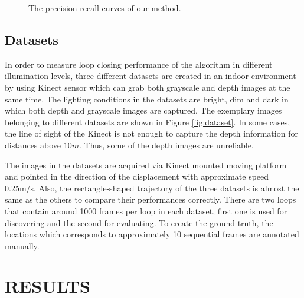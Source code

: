 \documentclass[]{spie}  %
\begin{document}
\begin{figure}
        \hspace{-3mm}
        \caption{The precision-recall curves of our method.}
        \label{fig:pr_curves}
\end{figure}

\subsection{Datasets}

In order to measure loop closing performance of the algorithm in different illumination levels, three different datasets are created in an indoor environment by using Kinect sensor which can grab both grayscale and depth images at the same time. The lighting conditions in the datasets are bright, dim and dark in which both depth and grayscale images are captured. The exemplary images belonging to different datasets are shown in Figure \ref{fig:dataset}. In some cases, the line of sight of the Kinect is not enough to capture the depth information for distances above $10m$. Thus, some of the depth images are unreliable.

The images in the datasets are acquired via Kinect mounted moving platform and pointed in the direction of the displacement with approximate speed 0.25m/s. Also, the rectangle-shaped trajectory of the three datasets is almost the same as the others to compare their performances correctly. There are two loops that contain around 1000 frames per loop in each dataset, first one is used for discovering and the second for evaluating. To create the ground truth, the locations which corresponds to approximately 10 sequential frames are annotated manually. 


\section{RESULTS}
\label{sec:results}
\end{document}
